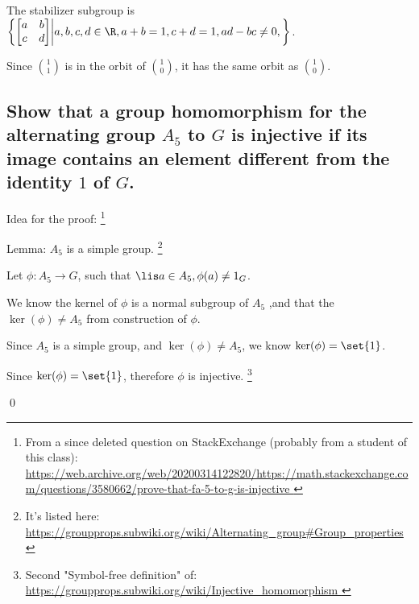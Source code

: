         The stabilizer subgroup is 
        \(
            \left\{
                \begin{bmatrix}
                    a & b \\
                    c & d
                \end{bmatrix}
                \middle|
                a,b,c,d \in \R,
                a + b = 1,
                c + d = 1,
                ad - bc \neq 0,
            \right\}
        \).

        Since $\binom{1}{1}$ is in the orbit of $\binom{1}{0}$, 
        it has the same orbit as $\binom{1}{0}$.


    \subsection[(iii)]{Show that a group homomorphism for the alternating group $A_5$ to $G$ is injective
        if its image contains an element different from the identity $1$ of $G$.}
        Idea for the proof:
        \footnote{
            From a since deleted question on StackExchange (probably from a student of this class):
            \url{
                https://web.archive.org/web/20200314122820/https://math.stackexchange.com/questions/3580662/prove-that-fa-5-to-g-is-injective
            }
        }

        Lemma: $A_5$ is a simple group. \footnote{
            It's listed here:
            \url{https://groupprops.subwiki.org/wiki/Alternating_group\#Group_properties}
        }

        Let $\phi: A_5 \to G$, such that $\lis a \in A_5, \phi(a) \neq 1_G$.
        
        We know the kernel of $\phi$ is a normal subgroup of $A_5$
        ,and that the $\ker(\phi) \neq A_5$ from construction of $\phi$.

        Since $A_5$ is a simple group, and $\ker(\phi) \neq A_5$, we know $\ker(\phi) = \set{1}$.

        Since $\ker(\phi) = \set{1}$, therefore $\phi$ is injective.
        \footnote{
            Second "Symbol-free definition" of:
            \url{
                https://groupprops.subwiki.org/wiki/Injective_homomorphism
            }
        }

        \qed